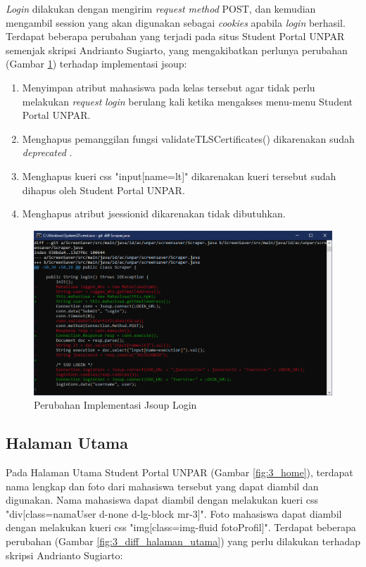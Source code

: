\textit{Login} dilakukan dengan mengirim \textit{request method} POST, dan kemudian mengambil session yang akan digunakan sebagai \textit{cookies} apabila \textit{login} berhasil.
Terdapat beberapa perubahan yang terjadi pada situs Student Portal UNPAR semenjak skripsi Andrianto Sugiarto, yang mengakibatkan perlunya perubahan (Gambar \ref{fig:3_diff_login}) terhadap implementasi jsoup:

\begin{enumerate}
    \item Menyimpan atribut mahasiswa pada kelas tersebut agar tidak perlu melakukan \textit{request} \textit{login} berulang kali ketika mengakses menu-menu Student Portal UNPAR.
    \item Menghapus pemanggilan fungsi validateTLSCertificates() dikarenakan sudah \textit{deprecated} \cite{jsoup}.
    \item Menghapus kueri css "input[name=lt]" dikarenakan kueri tersebut sudah dihapus oleh Student Portal UNPAR.
    \item Menghapus atribut jsessionid dikarenakan tidak dibutuhkan.
\end{enumerate}

\begin{figure}[H]
	\centering
	\includegraphics[scale=0.6]{Gambar/diff_login.png}
	\caption{Perubahan Implementasi Jsoup Login} 
	\label{fig:3_diff_login}
\end{figure}

\subsection{Halaman Utama}
Pada Halaman Utama Student Portal UNPAR (Gambar \ref{fig:3_home}), terdapat nama lengkap dan foto dari mahasiswa tersebut yang dapat diambil dan digunakan. Nama mahasiswa dapat diambil dengan melakukan kueri css "div[class=namaUser d-none d-lg-block mr-3]". Foto mahasiswa dapat diambil dengan melakukan kueri css "img[class=img-fluid fotoProfil]".
Terdapat beberapa perubahan (Gambar \ref{fig:3_diff_halaman_utama}) yang perlu dilakukan terhadap skripsi Andrianto Sugiarto:

